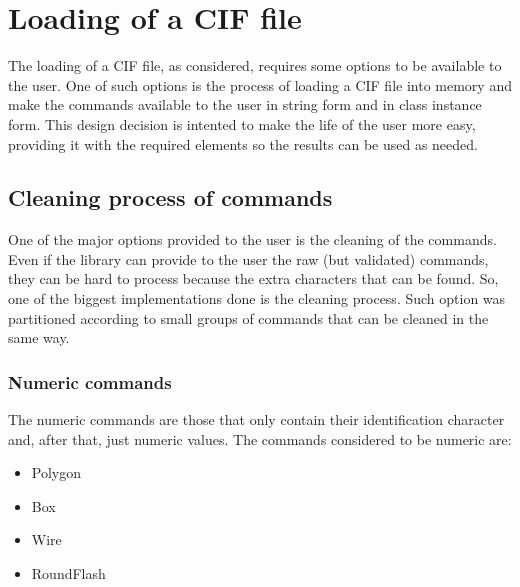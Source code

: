 \documentclass[11pt,twoside,openany,x11names,svgnames]{memoir}
\begin{document}
\section{Loading of a CIF file}\label{Loading-of-a-CIF-file}

The loading of a CIF file, as considered, requires some options to be available to the user. One of such options is the process of loading a CIF file into memory and make the commands available to the user in string form and in class instance form. This design decision is intented to make the life of the user more easy, providing it with the required elements so the results can be used as needed.

\subsection{Cleaning process of commands}\label{Cleaning-process-of-commands}

One of the major options provided to the user is the cleaning of the commands. Even if the library can provide to the user the raw (but validated) commands, they can be hard to process because the extra characters that can be found. So, one of the biggest implementations done is the cleaning process. Such option was partitioned according to small groups of commands that can be cleaned in the same way.

\subsubsection{Numeric commands}\label{Numeric-commands}

The numeric commands are those that only contain their identification character and, after that, just numeric values. The commands considered to be numeric are:

\begin{itemize}
\item Polygon
\item Box
\item Wire
\item RoundFlash
\end{itemize}
\end{document}

